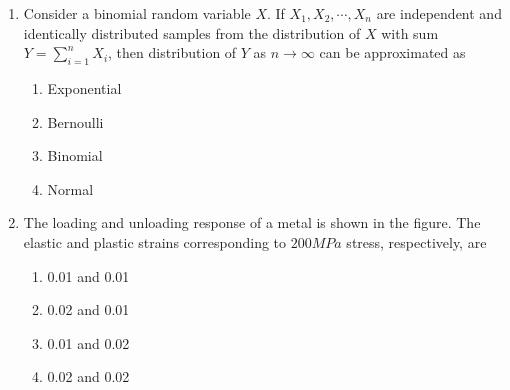 \documentclass[journal,12pt,onecolumn]{IEEEtran}
\theoremstyle{remark}
\begin{document}
\begin{enumerate}
\item Consider a binomial random variable $X$. If $X_1, X_2, \cdots , X_n$ are independent and 
    identically distributed samples from the distribution of $X$ with sum $Y = \sum_{i = 1}^{n}X_i$,
    then distribution of $Y$ as $n \rightarrow \infty$ can be approximated as
        \hfill{}
        \begin{multicols}{4}
            \begin{enumerate}
                \item Exponential
                    \columnbreak
                \item Bernoulli
                    \columnbreak
                \item Binomial
                    \columnbreak
                \item Normal
            \end{enumerate}
        \end{multicols}
    \item The loading and unloading response of a metal is shown in the figure. The elastic and
        plastic strains corresponding to $200 MPa$ stress, respectively, are
        \begin{center}
            \resizebox{0.5\textwidth}{!}{
                
            } 
        \end{center}
        \hfill{}

        \begin{multicols}{4}
            \begin{enumerate}
                \item 0.01 and 0.01
                    \columnbreak
                \item 0.02 and 0.01
                    \columnbreak
                \item 0.01 and 0.02
                    \columnbreak
                \item 0.02 and 0.02
            \end{enumerate}
        \end{multicols}


\end{enumerate}
\end{document}
